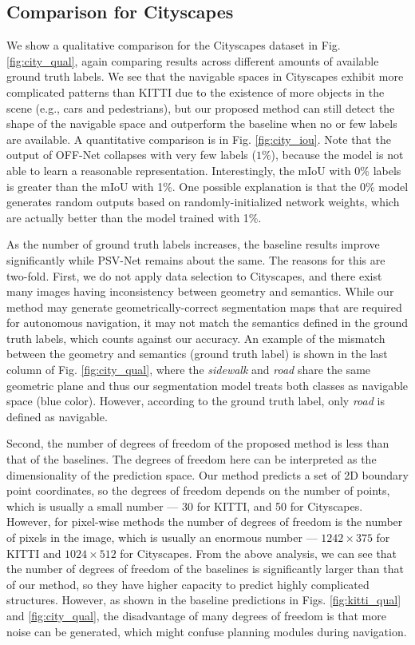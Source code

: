 \documentclass[letterpaper, 10 pt, journal, twoside]{ieeetran}
\begin{document}
\subsection{Comparison for Cityscapes} 
We show a qualitative comparison for the Cityscapes dataset in Fig. \ref{fig:city_qual}, again comparing results across different amounts of available ground truth labels.
We see that the navigable spaces in Cityscapes exhibit more complicated patterns than KITTI due to the existence of more objects in the scene (e.g., cars and pedestrians), but our proposed method can still detect the shape of the navigable space and outperform the baseline when no or few labels are available. A quantitative comparison is in Fig. \ref{fig:city_iou}. Note that the output of OFF-Net collapses with very few labels ($1\%$), because the model is not able to learn a reasonable representation. Interestingly, the mIoU with 0\% labels is greater than the mIoU with 1\%. One possible explanation is that the 0\% model generates random outputs based on randomly-initialized network weights, which are actually better than the model trained with 1\%.


As the number of ground truth labels increases, the baseline results improve significantly while  PSV-Net remains about the same. The reasons for this are two-fold. First, we do not apply data selection to  Cityscapes, and there exist many images having  inconsistency between  geometry and semantics. While our  method may generate  geometrically-correct segmentation maps that are required for autonomous navigation, it may not match the semantics defined in the ground truth labels, which
counts against our accuracy.
An example of the mismatch between the geometry and semantics (ground truth label) is shown in the last column of Fig. \ref{fig:city_qual}, where the \textit{sidewalk} and \textit{road} share the same geometric plane and thus our segmentation model treats both classes as  navigable space (blue color). However, according to the  ground truth label, only \textit{road} is defined as navigable. 

Second, the number of degrees of freedom of the proposed method is less than that of the baselines. The degrees of freedom here can be interpreted as the dimensionality of the prediction space. Our method  predicts a set of 2D  boundary point coordinates, so the degrees of freedom depends on the number of  points, which is usually a small number --- 30 for KITTI, and 50 for Cityscapes. However, for pixel-wise methods the number of degrees of freedom is the number of pixels in the image, which is usually an enormous number --- $1242\times 375$ for KITTI and $1024\times 512$ for Cityscapes. From the above analysis, we can see that the number of degrees of freedom of the baselines is significantly larger than that of our  method, so they have higher capacity to predict highly complicated
structures.
However, as shown in the baseline predictions in Figs. \ref{fig:kitti_qual} and \ref{fig:city_qual}, the disadvantage of many degrees of freedom is that more noise can be generated, which might confuse planning modules during navigation.
\end{document}
